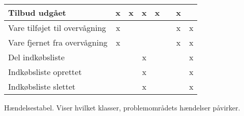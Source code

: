 \begin{table}[h]
\begin{tabular}{|l|l|c|c|c|c|c|c|c|}
\multicolumn{2}{|l|}{Tilbud udgået}                 & x                           & x                          & x                                 & x                         &                               & x                         &                             \\ \hline
\multicolumn{2}{|l|}{Vare tilføjet til overvågning} & x                           &                            &                                   &                           &                               & x                         & x                           \\ \hline
\multicolumn{2}{|l|}{Vare fjernet fra overvågning}  & x                           &                            &                                   &                           &                               & x                         & x                           \\ \hline
\multicolumn{2}{|l|}{Del indkøbsliste}              &                             &                            & x                                 &                           &                               &                           & x                           \\ \hline
\multicolumn{2}{|l|}{Indkøbsliste oprettet}         &                             &                            & x                                 &                           &                               &                           & x                           \\ \hline
\multicolumn{2}{|l|}{Indkøbsliste slettet}          &                             &                            & x                                 &                           &                               &                           & x                           \\ \hline
\end{tabular}
Hændelsestabel. Viser hvilket klasser, problemområdets hændelser påvirker.
\end{table}	

